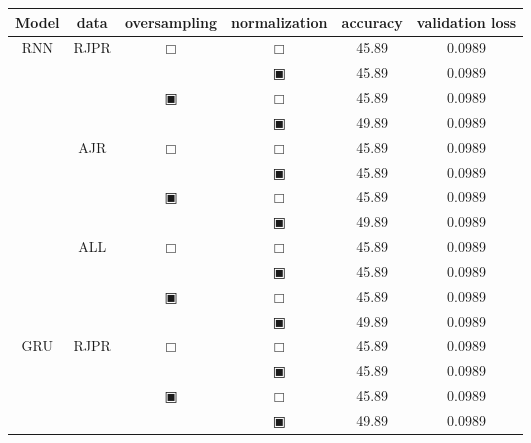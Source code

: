 \begin{table}[H]
	\renewcommand{\arraystretch}{.68}
	\begin{tabular}{|c|c|c|c|c|c|}
		\hline
		Model & data & oversampling & normalization & accuracy & validation loss\\
		\hline\hline
		\multirow{8}{*}{RNN}& \multirow{4}{*}{ RJPR } & \multirow{2}{*}{$\Box$} & $\Box$ & 45.89 & 0.0989\\\cline{4-6}
				    &                    &                         & $\blackinwhitesquare$ & 45.89 & 0.0989\\\cline{3-6}
				    &                    & \multirow{2}{*}{$\blackinwhitesquare$} & $\Box$ & 45.89 & 0.0989\\\cline{4-6}
				    &                    &                         & $\blackinwhitesquare$ & 49.89 & 0.0989\\\cline{2-6}
				    & \multirow{4}{*}{ AJR } & \multirow{2}{*}{$\Box$} & $\Box$ & 45.89 & 0.0989\\\cline{4-6}
				    &                     &                         & $\blackinwhitesquare$ & 45.89 & 0.0989\\\cline{3-6}
				    &                     & \multirow{2}{*}{$\blackinwhitesquare$} & $\Box$ & 45.89 & 0.0989\\\cline{4-6}
				    &                     &                         & $\blackinwhitesquare$ & 49.89 & 0.0989\\\cline{2-6}
				    & \multirow{4}{*}{ ALL } & \multirow{2}{*}{$\Box$} & $\Box$ & 45.89 & 0.0989\\\cline{4-6}
				    &                     &                         & $\blackinwhitesquare$ & 45.89 & 0.0989\\\cline{3-6}
				    &                     & \multirow{2}{*}{$\blackinwhitesquare$} & $\Box$ & 45.89 & 0.0989\\\cline{4-6}
				    &                     &                         & $\blackinwhitesquare$ & 49.89 & 0.0989\\\cline{2-6}
		\hline\hline
		\multirow{8}{*}{GRU}& \multirow{4}{*}{ RJPR } & \multirow{2}{*}{$\Box$} & $\Box$ & 45.89 & 0.0989\\\cline{4-6}
				    &                    &                         & $\blackinwhitesquare$ & 45.89 & 0.0989\\\cline{3-6}
				    &                    & \multirow{2}{*}{$\blackinwhitesquare$} & $\Box$ & 45.89 & 0.0989\\\cline{4-6}
				    &                    &                         & $\blackinwhitesquare$ & 49.89 & 0.0989\\\cline{2-6}

\end{tabular}
\end{table}
